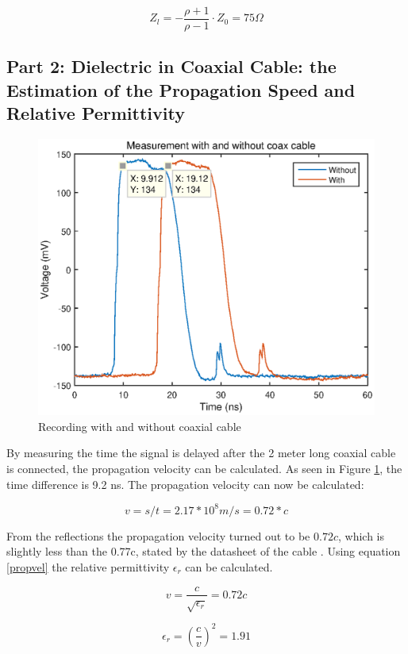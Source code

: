 \begin{equation}
	Z_l = - \frac{\rho + 1}{\rho - 1} \cdot Z_0 = 75 \Omega
\end{equation}

\subsection*{Part 2:  Dielectric in Coaxial Cable: the Estimation of the Propagation Speed and Relative Permittivity}

\begin{figure}[h!]
\centering
\includegraphics[width=\textwidth]{plots/part_2.eps}
\caption{Recording with and without coaxial cable}
\label{fig:p2}
\end{figure}

By measuring the time the signal is delayed after the 2 meter long coaxial cable is connected, the propagation velocity can be calculated. As seen in Figure \ref{fig:p2}, the time difference is 9.2 ns. The propagation velocity can now be calculated:

\begin{equation}
	v = s/t = 2.17*10^8 m/s = 0.72*c
\end{equation}

From the reflections the propagation velocity turned out to be $0.72c$, which is slightly less than the 0.77c, stated by the datasheet of the cable \cite{datasheetcable}. 
Using equation \ref{propvel} the relative permittivity $\epsilon_r$ can be calculated.

\begin{equation}
\label{propvel}
	v = \frac{c}{\sqrt{\epsilon_r}} = 0.72 c
\end{equation}

\begin{equation}
	\epsilon_r = (\frac{c}{v})^2 = 1.91
\end{equation}
